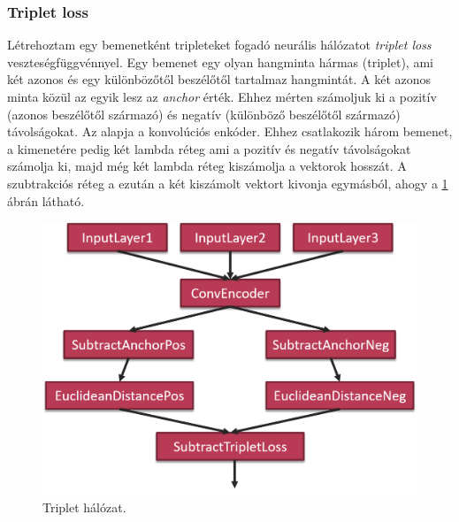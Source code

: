 \subsubsection{Triplet loss}

Létrehoztam egy bemenetként tripleteket fogadó neurális hálózatot \emph{triplet loss} veszteségfüggvénnyel. Egy bemenet egy olyan hangminta hármas (triplet), ami két azonos és egy különbözőtől beszélőtől tartalmaz hangmintát. 
\newline
\newline
A két azonos minta közül az egyik lesz az \emph{anchor} érték. Ehhez mérten számoljuk ki a pozitív (azonos beszélőtől származó) és negatív (különböző beszélőtől származó) távolságokat. 
\newline
\newline
Az alapja a konvolúciós enkóder. Ehhez csatlakozik három bemenet, a kimenetére pedig két lambda réteg ami a pozitív és negatív távolságokat számolja ki, majd még két lambda réteg kiszámolja a vektorok hosszát. A szubtrakciós réteg a ezután a két kiszámolt vektort kivonja egymásból, ahogy a \ref{fig:triplet-network} ábrán látható.

\begin{figure}[!ht]
	\centering
	\includegraphics[width=120mm, keepaspectratio]{figures/triplet-network.png}
	\caption{Triplet hálózat.}
	\label{fig:triplet-network}
\end{figure}